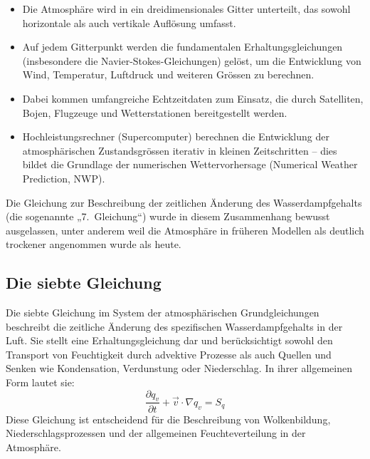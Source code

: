 \begin{itemize}
    \item Die Atmosphäre wird in ein dreidimensionales Gitter unterteilt, das sowohl horizontale als auch vertikale Auflösung umfasst.
    \item Auf jedem Gitterpunkt werden die fundamentalen Erhaltungsgleichungen (insbesondere die Navier-Stokes-Gleichungen) gelöst, um die Entwicklung von Wind, Temperatur, Luftdruck und weiteren Grössen zu berechnen.
    \item Dabei kommen umfangreiche Echtzeitdaten zum Einsatz, die durch Satelliten, Bojen, Flugzeuge und Wetterstationen bereitgestellt werden.
    \item Hochleistungsrechner (Supercomputer) berechnen die Entwicklung der atmosphärischen Zustandsgrössen iterativ in kleinen Zeitschritten – dies bildet die Grundlage der numerischen Wettervorhersage (Numerical Weather Prediction, NWP).
\end{itemize}

Die Gleichung zur Beschreibung der zeitlichen Änderung des Wasserdampfgehalts (die sogenannte „7.~Gleichung“) wurde in diesem Zusammenhang bewusst ausgelassen, unter anderem weil die Atmosphäre in früheren Modellen als deutlich trockener angenommen wurde als heute.

\subsection{Die siebte Gleichung}

Die siebte Gleichung im System der atmosphärischen Grundgleichungen beschreibt die zeitliche Änderung des spezifischen Wasserdampfgehalts in der Luft. Sie stellt eine Erhaltungsgleichung dar und berücksichtigt sowohl den Transport von Feuchtigkeit durch advektive Prozesse als auch Quellen und Senken wie Kondensation, Verdunstung oder Niederschlag.
In ihrer allgemeinen Form lautet sie:
\begin{equation}
\frac{\partial q_v}{\partial t} + \vec{v} \cdot \nabla q_v = S_q
\label{geostrophisch:equation6}
\end{equation}
Diese Gleichung ist entscheidend für die Beschreibung von Wolkenbildung, Niederschlagsprozessen und der allgemeinen Feuchteverteilung in der Atmosphäre.

